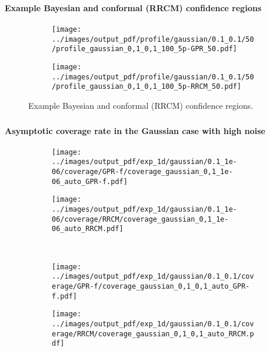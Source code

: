 \documentclass[t]{beamer}  %
\begin{document}
\begin{frame}[c]\frametitle{\insertsection}
  \framesubtitle{Example Bayesian and conformal (RRCM) confidence regions}
  \begin{figure}%
    \centering
    \begin{subfigure}[b]{0.45\linewidth}
      \texttt{[image: ../images/output\_pdf/profile/gaussian/0.1\_0.1/50/profile\_gaussian\_0,1\_0,1\_100\_5p-GPR\_50.pdf]}
    \end{subfigure}%
    \begin{subfigure}[b]{0.45\linewidth}
      \texttt{[image: ../images/output\_pdf/profile/gaussian/0.1\_0.1/50/profile\_gaussian\_0,1\_0,1\_100\_5p-RRCM\_50.pdf]}
    \end{subfigure}
    \caption{Example Bayesian and conformal (RRCM) confidence regions.}
    \label{fig:gauss_1d_prof_gpr}
  \end{figure}
\end{frame}

\begin{frame}[t]\frametitle{\insertsection}
  \framesubtitle{Asymptotic coverage rate in the Gaussian case with high noise}
  \begin{figure}
    \centering
    \begin{subfigure}[b]{0.45\linewidth}
      \texttt{[image: ../images/output\_pdf/exp\_1d/gaussian/0.1\_1e-06/coverage/GPR-f/coverage\_gaussian\_0,1\_1e-06\_auto\_GPR-f.pdf]}
    \end{subfigure}%
    \begin{subfigure}[b]{0.45\linewidth}
      \texttt{[image: ../images/output\_pdf/exp\_1d/gaussian/0.1\_1e-06/coverage/RRCM/coverage\_gaussian\_0,1\_1e-06\_auto\_RRCM.pdf]}
    \end{subfigure}\\
    \begin{subfigure}[b]{0.45\linewidth}
      \texttt{[image: ../images/output\_pdf/exp\_1d/gaussian/0.1\_0.1/coverage/GPR-f/coverage\_gaussian\_0,1\_0,1\_auto\_GPR-f.pdf]}
    \end{subfigure}%
    \begin{subfigure}[b]{0.45\linewidth}
      \texttt{[image: ../images/output\_pdf/exp\_1d/gaussian/0.1\_0.1/coverage/RRCM/coverage\_gaussian\_0,1\_0,1\_auto\_RRCM.pdf]}
    \end{subfigure}\\
  \end{figure}
\end{frame}
\end{document}
